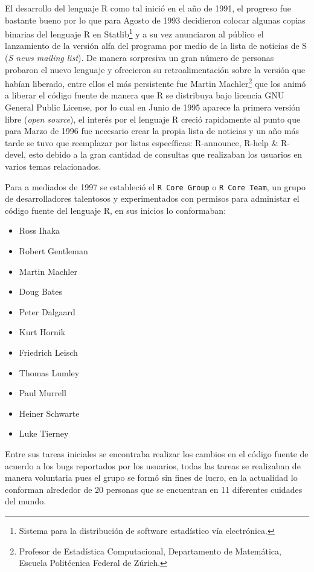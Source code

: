 \documentclass[11pt,a4paper,oneside]{book}\usepackage[]{graphicx}\usepackage[]{color}
\begin{document}
El desarrollo del lenguaje R como tal inició en el año de 1991, el progreso fue bastante bueno por lo que para Agosto de 1993 decidieron colocar algunas copias binarias del lenguaje R en Statlib\footnote{Sistema para la distribución de software estadístico vía electrónica.} y a su vez anunciaron al público el lanzamiento de la versión alfa del programa por medio de la lista de noticias de S (\emph{S news mailing list}). De manera sorpresiva un gran número de personas probaron el nuevo lenguaje y ofrecieron su retroalimentación sobre la versión que habían liberado, entre ellos el más persistente fue Martin Machler\footnote{Profesor de Estadística Computacional, Departamento de Matemática, Escuela Politécnica Federal de Zúrich.} que los animó a liberar el código fuente de manera que R se distribuya bajo licencia GNU General Public License, por lo cual en Junio de 1995 aparece la primera versión libre (\emph{open source}), el interés por el lenguaje R creció rapidamente al punto que para Marzo de 1996 fue necesario crear la propia lista de noticias y un año más tarde se tuvo que reemplazar por listas específicas: R-announce, R-help $\&$ R-devel, esto debido a la gran cantidad de consultas que realizaban los usuarios en varios temas relacionados.\newline

Para a mediados de 1997 se estableció el \texttt{R Core Group} o \texttt{R Core Team}, un grupo de desarrolladores talentosos y experimentados con permisos para administar el código fuente del lenguaje R, en sus inicios lo conformaban:
\begin{multicols}{3}
\begin{itemize}
   \item Ross Ihaka
   \item Robert Gentleman
   \item Martin Machler
   \item Doug Bates
   \item Peter Dalgaard
   \item Kurt Hornik
   \item Friedrich Leisch
   \item Thomas Lumley
   \item Paul Murrell
   \item Heiner Schwarte
   \item Luke Tierney
\end{itemize}
\end{multicols}

Entre sus tareas iniciales se encontraba realizar los cambios en el código fuente de acuerdo a los bugs reportados por los usuarios, todas las tareas se realizaban de manera voluntaria pues el grupo se formó sin fines de lucro, en la actualidad lo conforman alrededor de 20 personas que se encuentran en 11 diferentes cuidades del mundo.\newline
\end{document}

